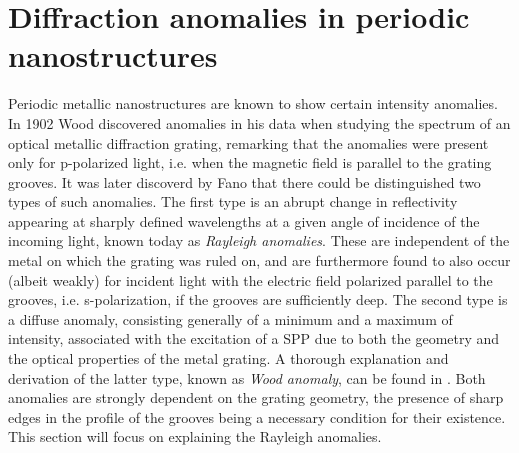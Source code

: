 \section{Diffraction anomalies in periodic nanostructures}
Periodic metallic nanostructures are known to show certain intensity anomalies. In 1902 Wood discovered anomalies in his data when studying the spectrum of an optical metallic diffraction grating, remarking that the anomalies were present only for p-polarized light, i.e. when the magnetic field is parallel to the grating grooves\cite{Wood1902}. It was later discoverd by Fano that there could be distinguished two types of such anomalies\cite{fano1941}. The first type is an abrupt change in reflectivity appearing at sharply defined wavelengths at a given angle of incidence of the incoming light, known today as \emph{Rayleigh anomalies}\cite{plasmonics_wood}. These are independent of the metal on which the grating was ruled on, and are furthermore found to also occur (albeit weakly) for incident light with the electric field polarized parallel to the grooves, i.e. s-polarization, if the grooves are sufficiently deep\cite{RayleighWood_simonsen}. The second type is a diffuse anomaly, consisting generally of a minimum and a maximum of intensity, associated with the excitation of a SPP due to both the geometry and the optical properties of the metal grating\cite{RayleighWood_simonsen}\cite{fano1941}. A thorough explanation and derivation of the latter type, known as \emph{Wood anomaly}, can be found in \cite{plasmonics_wood}. Both anomalies are strongly dependent on the grating geometry, the presence of sharp edges in the profile of the grooves being a necessary condition for their existence\cite{fano1941}. This section will focus on explaining the Rayleigh anomalies.

